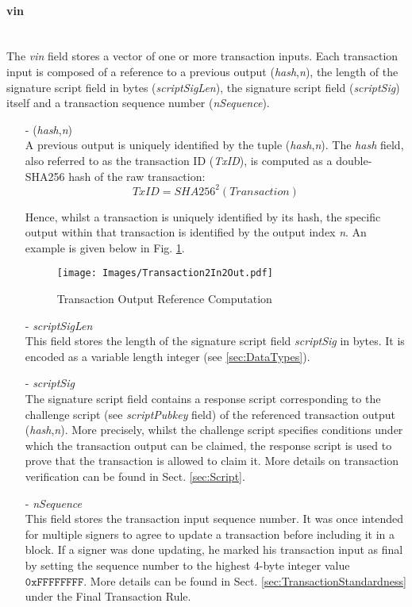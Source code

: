 \paragraph{vin}~\\
The \textit{vin} field stores a vector of one or more transaction inputs. Each transaction input is composed of a reference to a previous output (\textit{hash},\textit{n}), the length of the signature script field in bytes (\textit{scriptSigLen}),
the signature script field (\textit{scriptSig}) itself and a transaction sequence number (\textit{nSequence}).

\begin{itemize}
\item[-] (\textit{hash},\textit{n})~\\
A previous output is uniquely identified by the tuple (\textit{hash},\textit{n}). The \textit{hash} field, also referred to as the transaction ID (\textit{TxID}), is computed as a double-SHA256 hash of the raw transaction:
\begin{equation}
TxID = SHA256^{2}(Transaction)
\end{equation}

Hence, whilst a transaction is uniquely identified by its hash, the specific output within that transaction is identified by the output index \textit{n}. An example is given below in Fig. \ref{fig:PrevOut}.
\begin{figure}[ht!]
 \centering
 \texttt{[image: Images/Transaction2In2Out.pdf]}
 \caption{Transaction Output Reference Computation} \label{fig:PrevOut}
\end{figure}

\item[-] \textit{scriptSigLen}~\\
This field stores the length of the signature script field \textit{scriptSig} in bytes. It is encoded as a variable length integer (see \ref{sec:DataTypes}).

\item[-] \textit{scriptSig}~\\
The signature script field contains a response script corresponding to the challenge script (see \textit{scriptPubkey} field) of the referenced transaction output (\textit{hash},\textit{n}). More precisely, whilst the challenge script specifies conditions under which the transaction output can be claimed, the response script is used to prove that the transaction is allowed to claim it. More details on transaction verification can be found in Sect. \ref{sec:Script}.

\item[-] \textit{nSequence}~\\
This field stores the transaction input sequence number. It was once intended for multiple signers to agree to update a transaction before including it in a block. If a signer was done updating, he marked his transaction input as final by setting the sequence number to the highest 4-byte integer value $\texttt{0xFFFFFFFF}$. More details can be found in Sect. \ref{sec:TransactionStandardness} under the Final Transaction Rule.
\end{itemize}

